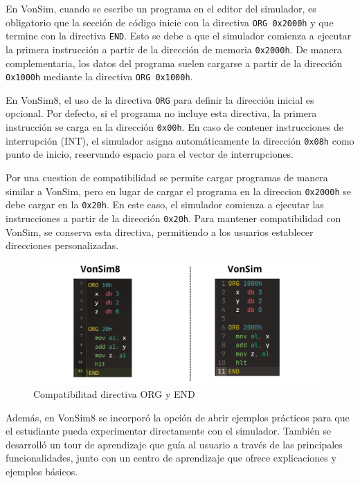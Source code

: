 \documentclass[12pt,oneside]{templates/unerthesis}
\begin{document}
En VonSim, cuando se escribe un programa en el editor del simulador, es obligatorio que la sección de código inicie con la directiva \texttt{ORG\ 0x2000h} y que termine con la directiva \texttt{END}. Esto se debe a que el simulador comienza a ejecutar la primera instrucción a partir de la dirección de memoria \texttt{0x2000h}. De manera complementaria, los datos del programa suelen cargarse a partir de la dirección \texttt{0x1000h} mediante la directiva \texttt{ORG\ 0x1000h}.

En VonSim8, el uso de la directiva \texttt{ORG} para definir la dirección inicial es opcional. Por defecto, si el programa no incluye esta directiva, la primera instrucción se carga en la dirección \texttt{0x00h}. En caso de contener instrucciones de interrupción (INT), el simulador asigna automáticamente la dirección \texttt{0x08h} como punto de inicio, reservando espacio para el vector de interrupciones.

Por una cuestion de compatibilidad se permite cargar programas de manera similar a VonSim, pero en lugar de cargar el programa en la direccion \texttt{0x2000h} se debe cargar en la \texttt{0x20h}. En este caso, el simulador comienza a ejecutar las instrucciones a partir de la dirección \texttt{0x20h}. Para mantener compatibilidad con VonSim, se conserva esta directiva, permitiendo a los usuarios establecer direcciones personalizadas.

\begin{figure}

{\centering \includegraphics[width=0.85\linewidth]{images/org} 

}

\caption{Compatibilitad directiva ORG y END}\label{fig:org}
\end{figure}

Además, en VonSim8 se incorporó la opción de abrir ejemplos prácticos para que el estudiante pueda experimentar directamente con el simulador. También se desarrolló un tour de aprendizaje que guía al usuario a través de las principales funcionalidades, junto con un centro de aprendizaje que ofrece explicaciones y ejemplos básicos.
\end{document}
